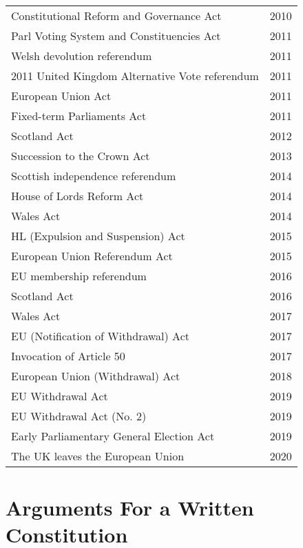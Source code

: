 \documentclass[14pt,titlepage]{extarticle}
\begin{document}
{\begin{longtable}{l l}
Constitutional Reform and Governance Act & 2010\\
Parl Voting System and Constituencies Act & 2011\\
Welsh devolution referendum & 2011\\
2011 United Kingdom Alternative Vote referendum & 2011\\
European Union Act &  2011\\
Fixed-term Parliaments Act & 2011\\
Scotland Act &  2012\\
Succession to the Crown Act &  2013\\
Scottish independence referendum & 2014\\
House of Lords Reform Act & 2014\\
Wales Act &  2014\\
HL (Expulsion and Suspension) Act & 2015\\
European Union Referendum Act & 2015\\
EU membership referendum & 2016\\
Scotland Act &  2016\\
Wales Act &  2017\\
EU (Notification of Withdrawal) Act & 2017\\
Invocation of Article 50 & 2017\\
European Union (Withdrawal) Act & 2018\\
EU Withdrawal Act &  2019\\
EU Withdrawal Act (No. 2) & 2019\\
Early Parliamentary General Election Act & 2019\\
The UK leaves the European Union & 2020\\
\end{longtable}
}%

\pagebreak
\section{Arguments For a Written Constitution}\label{For}
\end{document}
